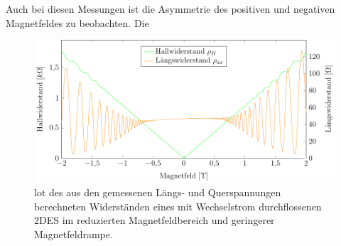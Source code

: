 Auch bei diesen Messungen ist die Asymmetrie des positiven und negativen Magnetfeldes zu beobachten. Die


\begin{figure}[h]
	\centering
	\includegraphics{graphs/ac/pm2T_range.pdf}
	\caption[Höher aufgelöste Gleichstrommessung in Magnetfeldteilbereich]{
		lot des aus den gemessenen Längs- und Querspannungen berechneten Widerständen eines mit Wechselstrom durchflossenen 2DES im reduzierten Magnetfeldbereich und geringerer Magnetfeldrampe.
	}
	\label{fig:2T_range_ac}
\end{figure}

